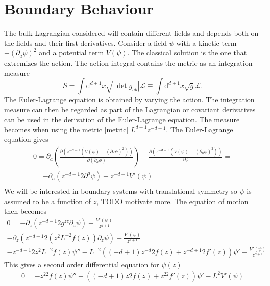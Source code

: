 \documentclass[12pt]{report}
\renewcommand{\d}{\ensuremath{\mathrm{d}}}
\renewcommand{\L}{\ensuremath{\mathcal{L}}}
\begin{document}
\section{Boundary Behaviour}
The bulk Lagrangian considered will contain different fields and depends both on the fields and their first derivatives. Consider a field $\psi$ with a kinetic term $-(\partial_a\psi)^2$ and a potential term $V(\psi)$. The classical solution is the one that extremizes the action. The action integral contains the metric as an integration measure
\begin{equation}
 S=\int\d^{d+1} x\sqrt{|\det g_{ab}|}\L\equiv\int\d^{d+1} x\sqrt{g}\L.
\end{equation}
The Euler-Lagrange equation is obtained by varying the action. The integration measure can then be regarded as part of the Lagrangian or covariant derivatives can be used in the derivation of the Euler-Lagrange equation. The measure becomes when using the metric \eqref{metric} $L^{d+1}z^{-d-1}$. The Euler-Lagrange equation gives
\begin{equation}
\begin{split}
 0=\partial_a\left(\frac{\partial (z^{-d-1}(V(\psi)-(\partial_b\psi)^2)) }{\partial(\partial_a\phi)}\right)-\frac{\partial  (z^{-d-1}(V(\psi)-(\partial_b\psi)^2) )}{\partial\phi}=\\
 =-\partial_a\left(z^{-d-1}2\partial^a\psi\right)-z^{-d-1}V'(\psi)\\
\end{split}
\end{equation}
We will be interested in boundary systems with translational symmetry so $\psi$ is assumed to be a function of $z$, TODO motivate more. The equation of motion then becomes
\begin{equation}
\begin{split}
0=-\partial_z\left(z^{-d-1}2g^{zz}\partial_z\psi\right)  -\frac{V'(\psi)}{z^{d+1}}=\\
-\partial_z\left(z^{-d-1}2(z^2L^{-2}f(z))\partial_z\psi\right)  -\frac{V'(\psi)}{z^{d+1}}=\\
-z^{-d-1}2z^2L^{-2}f(z)\psi''-L^{-2}\left((-d+1)z^{-d}2f(z) + z^{-d+1}2f'(z)\right)\psi' -\frac{V'(\psi)}{z^{d+1}}
\end{split}
\end{equation}
This gives a second order differential equation for $\psi(z)$
\begin{equation}
\begin{split}
0=-z^22f(z)\psi''-\left((-d+1)z2f(z) + z^22f'(z)\right)\psi' -L^2V'(\psi)
\end{split}
\end{equation}
\end{document}
